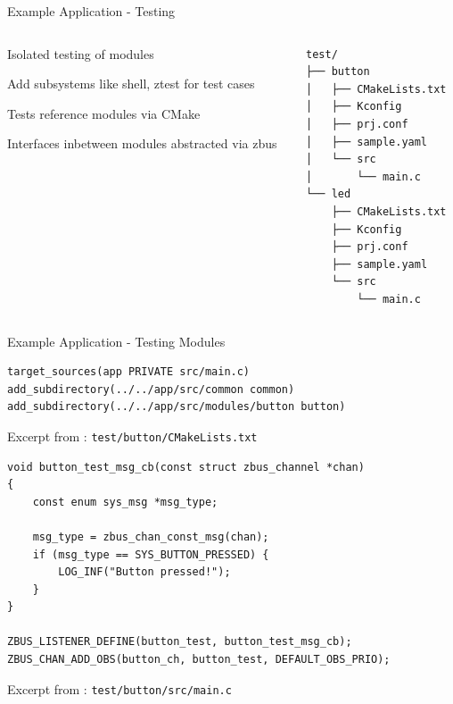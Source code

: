 \documentclass[10pt, aspectratio=169]{beamer}
\begin{document}
\begin{frame}[fragile]{Example Application - Testing}
  \begin{columns}
    \begin{column}{0.6\textwidth}
      Isolated testing of modules

      Add subsystems like shell, ztest for test cases

      Tests reference modules via CMake

      Interfaces inbetween modules abstracted via zbus
    \end{column}
    \begin{column}{0.4\textwidth}
        {\fontsize{6}{6}\selectfont
          \begin{verbatim}
test/
├── button
│   ├── CMakeLists.txt
│   ├── Kconfig
│   ├── prj.conf
│   ├── sample.yaml
│   └── src
│       └── main.c
└── led
    ├── CMakeLists.txt
    ├── Kconfig
    ├── prj.conf
    ├── sample.yaml
    └── src
        └── main.c
          \end{verbatim}
        }
    \end{column}
  \end{columns}
\end{frame}
\begin{frame}[fragile]{Example Application - Testing Modules}
  \begin{listing}[H]
    \begin{verbatim}
target_sources(app PRIVATE src/main.c)
add_subdirectory(../../app/src/common common)
add_subdirectory(../../app/src/modules/button button)
    \end{verbatim}
    \caption{\footnotesize{Excerpt from : \texttt{test/button/CMakeLists.txt}}}
  \end{listing}
  \begin{listing}[H]
    \begin{verbatim}
void button_test_msg_cb(const struct zbus_channel *chan)
{
	const enum sys_msg *msg_type;

	msg_type = zbus_chan_const_msg(chan);
	if (msg_type == SYS_BUTTON_PRESSED) {
		LOG_INF("Button pressed!");
	}
}

ZBUS_LISTENER_DEFINE(button_test, button_test_msg_cb);
ZBUS_CHAN_ADD_OBS(button_ch, button_test, DEFAULT_OBS_PRIO);
    \end{verbatim}
    \caption{\footnotesize{Excerpt from : \texttt{test/button/src/main.c}}}
  \end{listing}
\end{frame}
\end{document}
